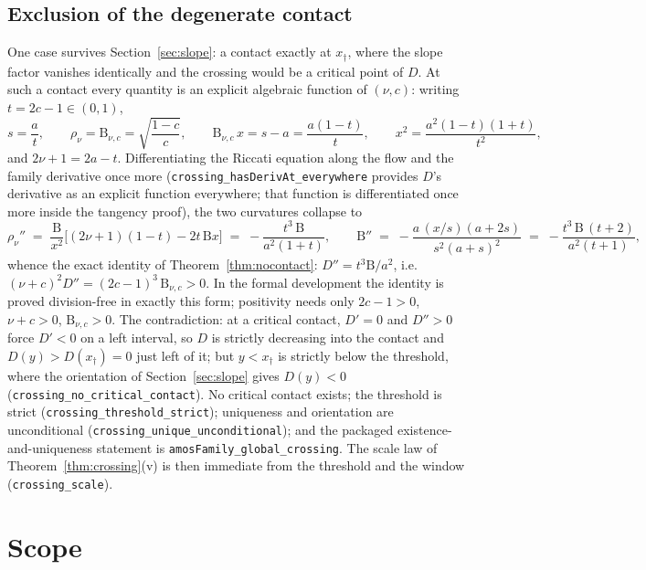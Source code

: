 \documentclass[11pt]{article}
\newcommand{\lean}[1]{\texttt{#1}}
\newcommand{\Bfam}{\mathrm{B}}
\begin{document}
\subsection{Exclusion of the degenerate contact}\label{sec:tangency}

One case survives Section~\ref{sec:slope}: a contact exactly at
$x_\dagger$, where the slope factor vanishes identically and the
crossing would be a critical point of $D$.  At such a contact every
quantity is an explicit algebraic function of $(\nu, c)$: writing
$t = 2c-1 \in (0,1)$,
\[
s = \frac{a}{t}, \qquad
\rho_\nu = \Bfam_{\nu,c} = \sqrt{\frac{1-c}{c}}, \qquad
\Bfam_{\nu,c}\, x = s-a = \frac{a(1-t)}{t}, \qquad
x^2 = \frac{a^2(1-t)(1+t)}{t^2},
\]
and $2\nu+1 = 2a-t$.  Differentiating the Riccati equation along
the flow and the family derivative once more
(\lean{crossing\_hasDerivAt\_everywhere} provides $D$'s derivative
as an explicit function everywhere; that function is differentiated
once more inside the tangency proof),
the two curvatures collapse to
\[
\rho_\nu'' \;=\; \frac{\Bfam}{x^2}\bigl[(2\nu+1)(1-t) -
2t\,\Bfam x\bigr] \;=\; -\frac{t^3\,\Bfam}{a^2(1+t)},
\qquad
\Bfam'' \;=\; -\frac{a\,(x/s)(a+2s)}{s^2(a+s)^2}
\;=\; -\frac{t^3\,\Bfam\,(t+2)}{a^2(t+1)},
\]
whence the exact identity of Theorem~\ref{thm:nocontact}:
$D'' = t^3\Bfam/a^2$, i.e.
$(\nu+c)^2 D'' = (2c-1)^3\,\Bfam_{\nu,c} > 0$.  In the formal
development the identity is proved division-free in exactly this
form; positivity needs only $2c-1 > 0$, $\nu+c > 0$,
$\Bfam_{\nu,c} > 0$.  The contradiction: at a critical contact,
$D' = 0$ and $D'' > 0$ force $D' < 0$ on a left interval, so $D$ is
strictly decreasing into the contact and $D(y) > D(x_\dagger) = 0$
just left of it; but $y < x_\dagger$ is strictly below the
threshold, where the orientation of Section~\ref{sec:slope} gives
$D(y) < 0$ (\lean{crossing\_no\_critical\_contact}).  No critical
contact exists; the threshold is strict
(\lean{crossing\_threshold\_strict}); uniqueness and orientation
are unconditional (\lean{crossing\_unique\_unconditional}); and the
packaged existence-and-uniqueness statement is
\lean{amosFamily\_global\_crossing}.  The scale law of
Theorem~\ref{thm:crossing}(v) is then immediate from the threshold
and the window (\lean{crossing\_scale}).

\section{Scope}\label{sec:scope}
\end{document}
